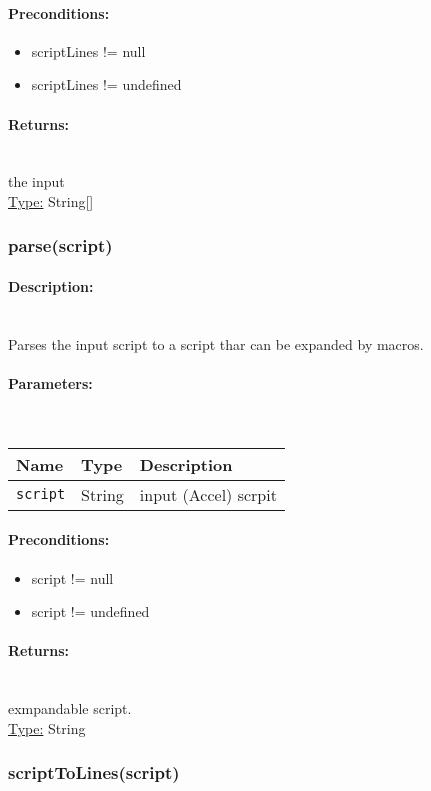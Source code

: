 \paragraph{Preconditions:} 
\begin{itemize}  
\item  scriptLines != null
\item  scriptLines != undefined
\end{itemize}  
\paragraph{Returns:} \hfill \\ 
the input\\ 
\underline{Type:} String[]
\subsubsection{parse(script)} 
\paragraph{Description:} \hfill \\ 
Parses the input script to a script thar can be expanded by macros.
\paragraph{Parameters:} \hfill \\ 
\begin{tabular}{|l|l|l|}
\hline
\textbf{Name} & \textbf{Type} & \textbf{Description} \\ 
\hline
\texttt{script} & String & input (Accel) scrpit\\ 
\hline
\end{tabular}
\paragraph{Preconditions:} 
\begin{itemize}  
\item  script != null
\item  script != undefined
\end{itemize}  
\paragraph{Returns:} \hfill \\ 
exmpandable script.\\ 
\underline{Type:} String
\subsubsection{scriptToLines(script)} 
